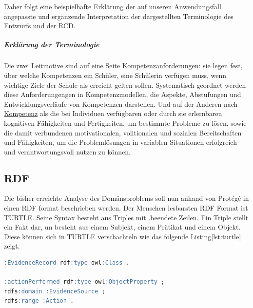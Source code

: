 \documentclass[
12pt,
english,
ngerman,
headsepline,
twoside,
openright,
numbers=noenddot,version=first
]{scrreprt}
\begin{document}
Daher folgt eine beispielhafte Erklärung der auf unseren Anwendungsfall angepasste und ergänzende Interpretation der dargestellten Terminologie des Entwurfs und der RCD.




\subparagraph{Erklärung der Terminologie}Die zwei Leitmotive sind auf eine Seite \underline{Kompetenzanforderungen}: sie legen fest, über welche Kompetenzen ein Schüler, eine Schülerin verfügen muss, wenn wichtige Ziele der Schule als erreicht gelten sollen. Systematisch geordnet werden diese Anforderungengen in Kompetenzmodellen, die Aspekte, Abstufungen und Entwicklungsverläufe von Kompetenzen darstellen\cite{competence}. Und auf der Anderen nach \underline{\Gls{Kompetenz}} als die bei Individuen verfügbaren oder durch sie erlernbaren kognitiven Fähigkeiten und Fertigkeiten, um bestimmte Probleme zu lösen, sowie die damit verbundenen motivationalen, volitionalen und sozialen Bereitschaften und Fähigkeiten, um die Problemlösungen in variablen Situationen erfolgreich und verantwortungsvoll nutzen zu können\cite{weinert2002leistungsmessungen}.

\subsection{RDF}
Die bisher erreichte Analyse des Domänsproblems soll nun anhand von Protégé in einen \acrfull{RDF} format beschrieben werden. Der Menschen lesbarsten \acrshort{RDF} Format ist \acrfull{TURTLE}. Seine Syntax besteht aus Triples mit \glqq .\grqq beendete Zeilen. Ein Triple stellt ein Fakt dar, un besteht aus einem Subjekt, einem Prätikat und einem Objekt. Diese können sich in TURTLE verschachteln wie das folgende Listing\ref{lst:turtle} zeigt.

\begin{lstlisting}[language=SQL,caption={Darstellung von Triples in TURTLE},label={lst:turtle}]
:EvidenceRecord rdf:type owl:Class .

:actionPerformed rdf:type owl:ObjectProperty ;
rdfs:domain :EvidenceSource ;
rdfs:range :Action .
\end{lstlisting}
\end{document}
